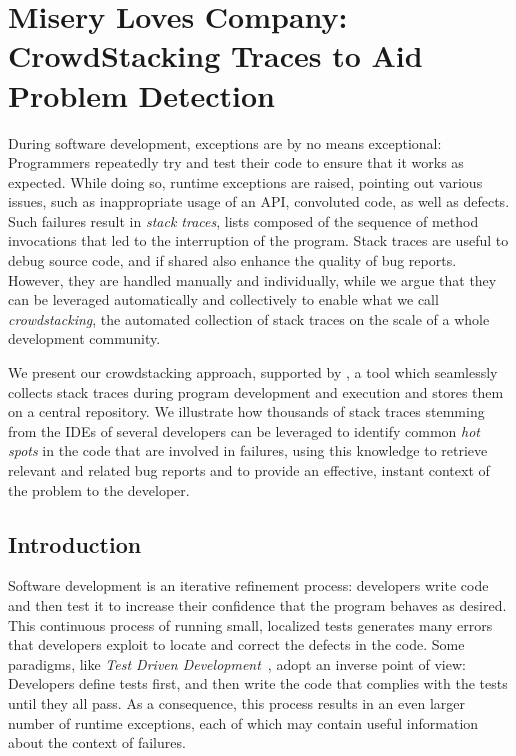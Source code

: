 


\chapter{Misery Loves Company: \\CrowdStacking Traces to Aid Problem Detection}\label{ch:stacktraces}


During software development, exceptions are by no means exceptional: Programmers repeatedly try and test their code to ensure that it works as expected. While doing so, runtime exceptions are raised, pointing out various issues, such as inappropriate usage of an API, convoluted code, as well as defects. Such failures result in \emph{stack traces}, lists composed of the sequence of method invocations that led to the interruption of the program. Stack traces are useful to debug source code, and if shared also enhance the quality of bug reports. However, they are handled manually and individually, while we argue that they can be leveraged automatically and collectively to enable what we call {\em crowdstacking}, the automated collection of stack traces on the scale of a whole development community. 

We present our crowdstacking approach, supported by \shr, a tool which seamlessly collects stack traces during program development and execution and stores them on a central repository. We illustrate how thousands of stack traces stemming from the IDEs of several developers can be leveraged to identify common {\em hot spots} in the code that are involved in failures, using this knowledge to retrieve relevant and related bug reports and to provide an effective, instant context of the problem to the developer.


\section{Introduction} \label{sec:introduction}

Software development is an iterative refinement process: developers write code and then test it to increase their confidence that the program behaves as desired. This continuous process of running small, localized tests generates many errors that developers exploit to locate and correct the defects in the code. Some paradigms, like \emph{Test Driven Development}~\cite{BeckTDD}, adopt an inverse point of view: Developers define tests first, and then write the code that complies with the tests until they all pass. As a consequence, this process results in an even larger number of runtime exceptions, each of which may contain useful information about the context of failures.

